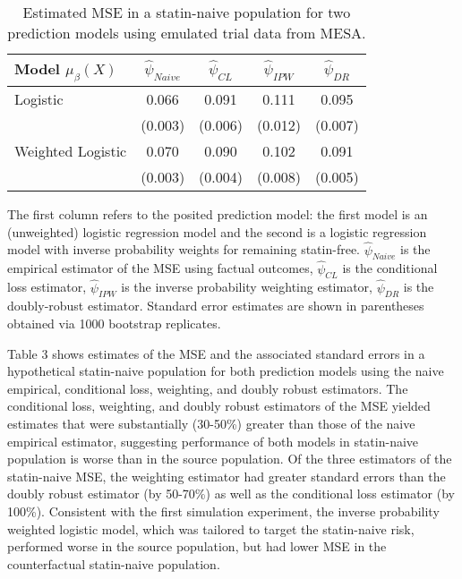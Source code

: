 \begin{table}[t]
    \centering
    \caption{Estimated MSE in a statin-naive population for two prediction models using emulated trial data from MESA.}
    \begin{threeparttable}
        \begin{tabular}{lcccc}
        \toprule
        Model $\mu_\beta(X)$ & $\widehat{\psi}_{Naive}$ & $\widehat{\psi}_{CL}$ & $\widehat{\psi}_{IPW}$ & $\widehat{\psi}_{DR}$\\
        \midrule
        Logistic & 0.066 & 0.091 & 0.111 & 0.095\\
         & (0.003) & (0.006) & (0.012) & (0.007)\\
        Weighted Logistic & 0.070 & 0.090 & 0.102 & 0.091\\
         & (0.003) & (0.004) & (0.008) & (0.005)\\
        \bottomrule
        \end{tabular}
        \begin{tablenotes}
        \item The first column refers to the posited prediction model: the first model is an (unweighted) logistic regression model and the second is a logistic regression model with inverse probability weights for remaining statin-free. $\widehat{\psi}_{Naive}$ is the empirical estimator of the MSE using factual outcomes, $\widehat{\psi}_{CL}$ is the conditional loss estimator, $\widehat{\psi}_{IPW}$ is the inverse probability weighting estimator, $\widehat{\psi}_{DR}$ is the doubly-robust estimator. Standard error estimates are shown in parentheses obtained via 1000 bootstrap replicates.
        \end{tablenotes}
        \end{threeparttable}
\end{table}

Table 3 shows estimates of the MSE and the associated standard errors in a hypothetical statin-naive population for both prediction models using the naive empirical, conditional loss, weighting, and doubly robust estimators. The conditional loss, weighting, and doubly robust estimators of the MSE yielded estimates that were substantially (30-50\%) greater than those of the naive empirical estimator, suggesting performance of both models in statin-naive population is worse than in the source population. Of the three estimators of the statin-naive MSE, the weighting estimator had greater standard errors than the doubly robust estimator (by 50-70\%) as well as the conditional loss estimator (by 100\%). Consistent with the first simulation experiment, the inverse probability weighted logistic model, which was tailored to target the statin-naive risk, performed worse in the source population, but had lower MSE in the counterfactual statin-naive population. 


